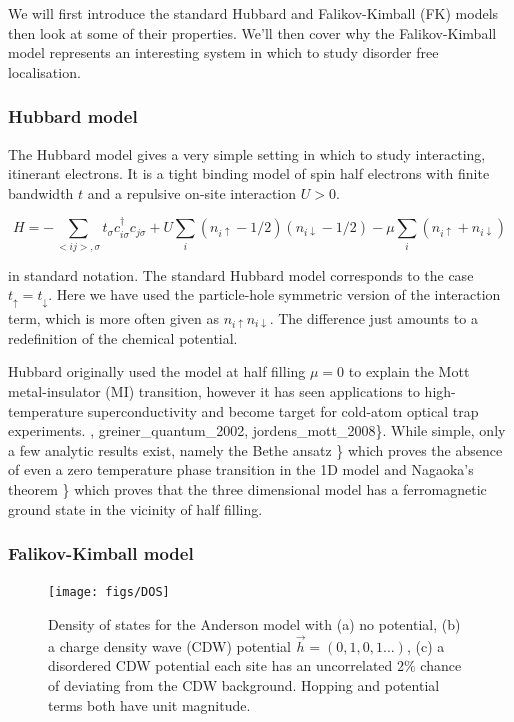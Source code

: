 We will first introduce the standard Hubbard and Falikov-Kimball (FK) models then look at some of their properties. We'll then cover why the Falikov-Kimball model represents an interesting system in which to study disorder free localisation.

\hypertarget{hubbard-model}{%
\subsubsection{Hubbard model}\label{hubbard-model}}

The Hubbard model gives a very simple setting in which to study interacting, itinerant electrons. It is a tight binding model of spin half electrons with finite bandwidth \(t\) and a repulsive on-site interaction \(U > 0\).

\[
    H = -\sum_{<ij>,\sigma} t_{\sigma} c^\dagger_{i\sigma}c_{j\sigma} + U \sum_{i} (n_{i \uparrow} - 1/2)( n_{i\downarrow} - 1/2) - \mu \sum_i \left( n_{i \uparrow} + n_{i \downarrow} \right)
\]

in standard notation. The standard Hubbard model corresponds to the case \(t_{\uparrow} = t_{\downarrow}\). Here we have used the particle-hole symmetric version of the interaction term, which is more often given as \(n_{i \uparrow} n_{i\downarrow}\). The difference just amounts to a redefinition of the chemical potential.

Hubbard originally used the model at half filling \(\mu = 0\) to explain the Mott metal-insulator (MI) transition, however it has seen applications to high-temperature superconductivity and become target for cold-atom optical trap experiments. \textcite{noauthor_hubbard_2013}, greiner\_quantum\_2002, jordens\_mott\_2008\}. While simple, only a few analytic results exist, namely the Bethe ansatz \textcite{lieb_absence_1968}\} which proves the absence of even a zero temperature phase transition in the 1D model and Nagaoka's theorem \textcite{nagaoka_ferromagnetism_1966}\} which proves that the three dimensional model has a ferromagnetic ground state in the vicinity of half filling.

\hypertarget{falikov-kimball-model}{%
\subsubsection{Falikov-Kimball model}\label{falikov-kimball-model}}

\begin{figure}
  \centering
    \texttt{[image: figs/DOS]}
  \caption{Density of states for the Anderson model with (a) no potential, (b) a charge density wave (CDW) potential $\vec{h} = (0,1,0,1...)$, (c) a disordered CDW potential each site has an uncorrelated $2\%$ chance of deviating from the CDW background. Hopping and potential terms both have unit magnitude.}
  \label{fig:fk_dos}
\end{figure}

